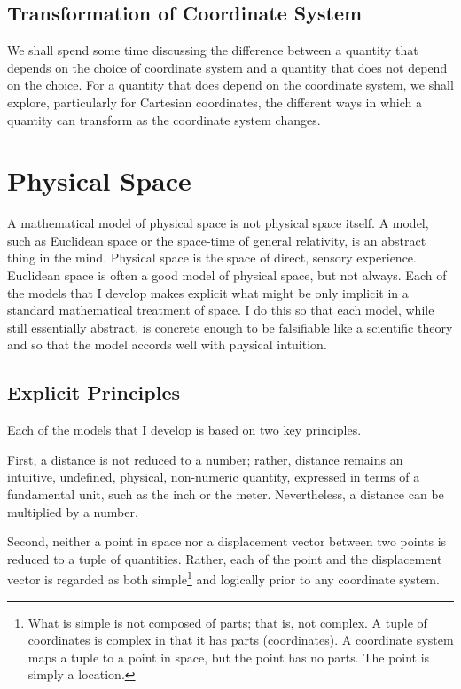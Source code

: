 \subsection{Transformation of Coordinate System}

We shall spend some time discussing the difference between a quantity that
depends on the choice of coordinate system and a quantity that does not depend
on the choice.  For a quantity that does depend on the coordinate system, we
shall explore, particularly for Cartesian coordinates, the different ways in
which a quantity can transform as the coordinate system changes.

\section{Physical Space}

A mathematical model of physical space is not physical space itself.  A model,
such as Euclidean space or the space-time of general relativity, is an abstract
thing in the mind.  Physical space is the space of direct, sensory experience.
Euclidean space is often a good model of physical space, but not always.  Each
of the models that I develop makes explicit what might be only implicit in a
standard mathematical treatment of space.  I do this so that each model, while
still essentially abstract, is concrete enough to be falsifiable like a
scientific theory and so that the model accords well with physical intuition.

\subsection{Explicit Principles}

Each of the models that I develop is based on two key principles.

First, a distance is not reduced to a number; rather, distance remains an
intuitive, undefined, physical, non-numeric quantity, expressed in terms of a
fundamental unit, such as the inch or the meter.  Nevertheless, a distance can
be multiplied by a number.

Second, neither a point in space nor a displacement vector between two points
is reduced to a tuple of quantities.  Rather, each of the point and the
displacement vector is regarded as both simple\footnote{%
   What is simple is not composed of parts; that is, not complex.  A tuple of
   coordinates is complex in that it has parts (coordinates).  A coordinate
   system maps a tuple to a point in space, but the point has no parts.  The
   point is simply a location.%
}
and logically prior to any coordinate system.

